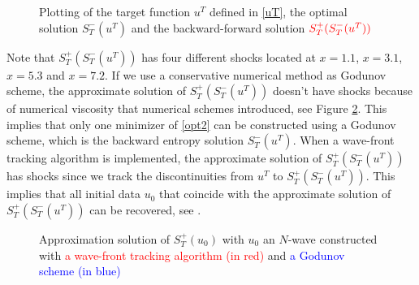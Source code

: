 \documentclass{article}
\begin{document}
\begin{figure}[H]
\begin{center}
{
}

\end{center}
\caption{Plotting of the target function $u^T$ defined in \eqref{uT}, the optimal solution $S_T^-(u^T)$ and the backward-forward solution $\textcolor{red}{S^{+}_T(S^{-}_T(u^T))}$  \label{uTplotting}}
\end{figure}

\par Note that $S_T^+(S_T^-(u^T))$ has four different shocks located at $x=1.1$, $x=3.1$, $x=5.3$ and $x=7.2$. If we use a conservative numerical method as Godunov scheme,  the approximate solution of $S_T^+(S_T^-(u^T))$ doesn't have shocks because of numerical viscosity that numerical schemes introduced, see Figure  \ref{God}. This implies that only one minimizer of \eqref{opt2} can be constructed using a Godunov scheme, which is the backward entropy solution $S_T^-(u^T)$. When a wave-front tracking algorithm is implemented, the approximate solution of $S_T^+(S_T^-(u^T))$ has shocks since we track the discontinuities from $u^T$ to  $S_T^+(S_T^-(u^T))$. This implies that all initial data $u_0$ that coincide with the approximate solution of $S_T^+ (S_T^-(u^T))$ can be recovered, see \cite[Section 3]{LZ19}.  \ \\
\begin{figure}[H]
\begin{center}

\end{center}
\caption{Approximation solution of $S_T^+(u_0)$ with $u_0$ an $N$-wave constructed with  \textcolor{red}{a wave-front tracking algorithm (in red)} and \textcolor{blue}{a Godunov scheme (in blue)} \label{God}}
\end{figure}
\end{document}
